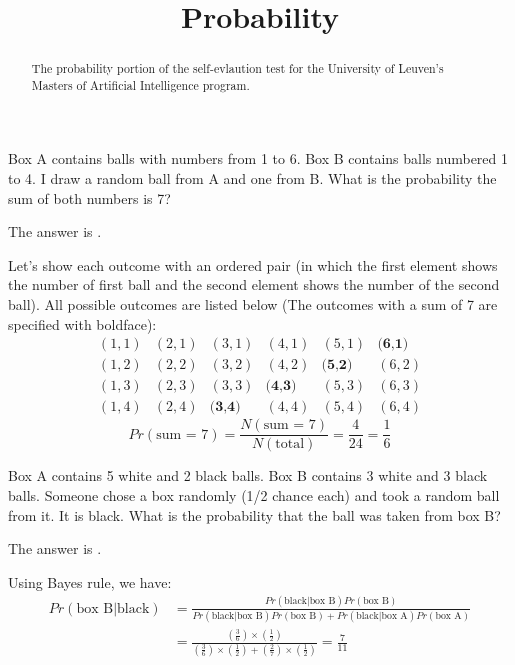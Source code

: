 \documentclass{ximera}
\title{Probability}
\begin{document}
\begin{abstract}
The probability portion of the self-evlaution test for the University
of Leuven's Masters of Artificial Intelligence program.
\end{abstract}
\maketitle


\begin{question}
Box A contains balls with numbers from 1 to 6.  Box B contains balls
numbered 1 to 4.  I draw a random ball from A and one from B.  What is
the probability the sum of both numbers is 7?
\begin{solution}
The answer is .
\end{solution}
Let's show each outcome with an ordered pair (in which the first
element shows the number of first ball and the second element shows
the number of the second ball). All possible outcomes are listed below
(The outcomes with a sum of 7 are specified with boldface):
\[
\begin{matrix}
(1,1) & (2,1) & (3,1) & (4,1) & (5,1) & \textbf{(6,1)} \\
(1,2) & (2,2) & (3,2) & (4,2) & \textbf{(5,2)} & (6,2) \\
(1,3) & (2,3) & (3,3) & \textbf{(4,3)} & (5,3) & (6,3) \\
(1,4) & (2,4) & \textbf{(3,4)} & (4,4) & (5,4) & (6,4)
\end{matrix}
\]
\[
Pr (\text{sum = 7}) = \frac{N(\text{sum = 7})}{N(\text{total})} =
\frac{4}{24} = \frac{1}{6}
\]
\end{question}

\begin{question}
Box A contains 5 white and 2 black balls.  Box B contains 3 white and
3 black balls.  Someone chose a box randomly (1/2 chance each) and
took a random ball from it.  It is black.  What is the probability
that the ball was taken from box B?
\begin{solution}
The answer is .
\end{solution}
Using Bayes rule, we have:
\begin{align*}
Pr (\text{box B} | \text{black}) &= \frac{Pr(\text{black} | \text{box B}) Pr(\text{box B})}{Pr(\text{black} | \text{box B}) Pr(\text{box B}) + Pr(\text{black} | \text{box A}) Pr(\text{box A})} \\
&=\frac{(\frac{3}{6}) \times (\frac{1}{2})}{(\frac{3}{6}) \times (\frac{1}{2}) + (\frac{2}{7}) \times (\frac{1}{2})} = \frac{7}{11}
\end{align*}
\end{question}
\end{document}
